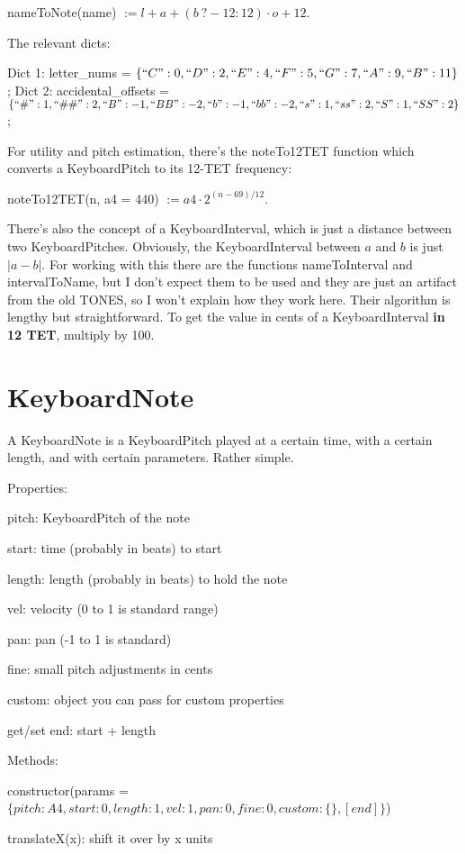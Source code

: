 \documentclass{article}
\begin{document}
nameToNote(name) $:=l + a + (b\: ? -12 : 12)\cdot o + 12.$

The relevant dicts:

Dict 1: letter\_nums = $\{ ``C": 0, ``D": 2, ``E": 4, ``F": 5, ``G": 7, ``A": 9, ``B": 11 \}$;
Dict 2: accidental\_offsets = $\{ ``\#": 1, ``\#\#": 2, ``B": -1, ``BB": -2, ``b": -1, ``bb": -2, ``s": 1, ``ss": 2, ``S": 1, ``SS": 2 \}$;

For utility and pitch estimation, there's the noteTo12TET function which converts a KeyboardPitch to its 12-TET frequency:

noteTo12TET(n, a4 = 440) $:= a4 \cdot 2^{(n - 69)/12}.$

There's also the concept of a KeyboardInterval, which is just a distance between two KeyboardPitches. Obviously, the KeyboardInterval between $a$ and $b$ is just $|a-b|$. For working with this there are the functions nameToInterval and intervalToName, but I don't expect them to be used and they are just an artifact from the old TONES, so I won't explain how they work here. Their algorithm is lengthy but straightforward. To get the value in cents of a KeyboardInterval \textbf{in 12 TET}, multiply by 100.

\section{KeyboardNote}

A KeyboardNote is a KeyboardPitch played at a certain time, with a certain length, and with certain parameters. Rather simple.

Properties:

pitch: KeyboardPitch of the note

start: time (probably in beats) to start

length: length (probably in beats) to hold the note

vel: velocity (0 to 1 is standard range)

pan: pan (-1 to 1 is standard)

fine: small pitch adjustments in cents

custom: object you can pass for custom properties

get/set end: start + length

Methods:

constructor(params = $\{pitch: A4, start: 0, length: 1, vel: 1, pan: 0, fine: 0, custom: \{\}, [end]\}$)

translateX(x): shift it over by x units
\end{document}

